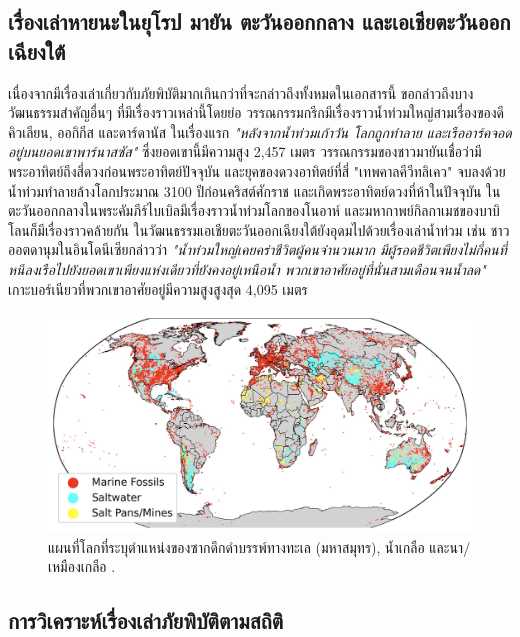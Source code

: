 \documentclass[10pt,twocolumn,letterpaper]{article}
\begin{document}
\subsection{เรื่องเล่าหายนะในยุโรป มายัน ตะวันออกกลาง และเอเชียตะวันออกเฉียงใต้}

เนื่องจากมีเรื่องเล่าเกี่ยวกับภัยพิบัติมากเกินกว่าที่จะกล่าวถึงทั้งหมดในเอกสารนี้ ขอกล่าวถึงบางวัฒนธรรมสำคัญอื่นๆ ที่มีเรื่องราวเหล่านี้โดยย่อ วรรณกรรมกรีกมีเรื่องราวน้ำท่วมใหญ่สามเรื่องของดีคิวเลียน, ออกิกีส และดาร์ดานัส \cite{9,10} ในเรื่องแรก \textit{"หลังจากน้ำท่วมเก้าวัน โลกถูกทำลาย และเรืออาร์คจอดอยู่บนยอดเขาพาร์นาสซัส"} ซึ่งยอดเขานี้มีความสูง 2,457 เมตร \cite{11} วรรณกรรมของชาวมายันเชื่อว่ามีพระอาทิตย์ถึงสี่ดวงก่อนพระอาทิตย์ปัจจุบัน และยุคของดวงอาทิตย์ที่สี่ "เทพคาลคีวีทลิเคว" จบลงด้วยน้ำท่วมทำลายล้างโลกประมาณ  3100 ปีก่อนคริสต์ศักราช และเกิดพระอาทิตย์ดวงที่ห้าในปัจจุบัน \cite{12} ในตะวันออกกลางในพระคัมภีร์ไบเบิลมีเรื่องราวน้ำท่วมโลกของโนอาห์ และมหากาพย์กิลกาเมชของบาบิโลนก็มีเรื่องราวคล้ายกัน \cite{13} ในวัฒนธรรมเอเชียตะวันออกเฉียงใต้ยังอุดมไปด้วยเรื่องเล่าน้ำท่วม เช่น ชาวออตดานุมในอินโดนีเซียกล่าวว่า \textit{"น้ำท่วมใหญ่เคยคร่าชีวิตผู้คนจำนวนมาก มีผู้รอดชีวิตเพียงไม่กี่คนที่หนีลงเรือไปยังยอดเขาเพียงแห่งเดียวที่ยังคงอยู่เหนือน้ำ พวกเขาอาศัยอยู่ที่นั่นสามเดือนจนน้ำลด"} \cite{3} เกาะบอร์เนียวที่พวกเขาอาศัยอยู่มีความสูงสูงสุด 4,095 เมตร

\begin{figure}[b]
\begin{center}
\includegraphics[width=1\textwidth]{marine.jpg}
\end{center}
   \caption{แผนที่โลกที่ระบุตำแหน่งของซากดึกดำบรรพ์ทางทะเล (มหาสมุทร), น้ำเกลือ และนา/เหมืองเกลือ \cite{15,16,86,87}.}
   \label{fig:2}
\end{figure}

\subsection{การวิเคราะห์เรื่องเล่าภัยพิบัติตามสถิติ}
\end{document}
